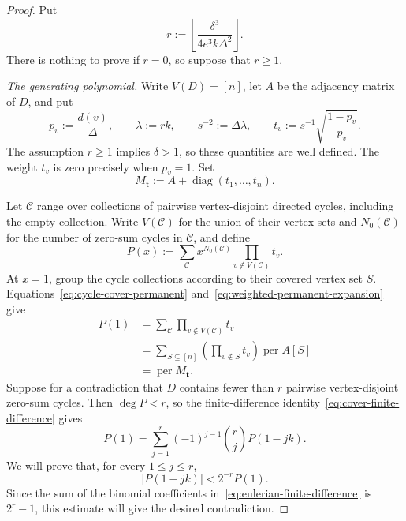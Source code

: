 \documentclass[10pt,a4paper]{amsart}
\newcommand{\diag}{\operatorname{diag}}
\newcommand{\per}{\operatorname{per}}
\begin{document}
\begin{proof}
Put
\[
  r:=\left\lfloor\frac{\delta^3}{4e^3k\Delta^2}\right\rfloor.
\]
There is nothing to prove if $r=0$, so suppose that $r\ge1$.

\medskip\noindent
\emph{The generating polynomial.}
Write $V(D)=[n]$, let $A$ be the adjacency matrix of $D$, and put
\[
  p_v:=\frac{d(v)}\Delta,
  \qquad \lambda:=rk,
  \qquad s^{-2}:=\Delta\lambda,
  \qquad
  t_v:=s^{-1}\sqrt{\frac{1-p_v}{p_v}}.
\]
The assumption $r\ge1$ implies $\delta>1$, so these quantities are
well defined.  The weight $t_v$ is zero precisely when $p_v=1$.
Set
\[
  M_{\mathbf t}:=A+\diag(t_1,\ldots,t_n).
\]

Let $\mathcal C$ range over collections of pairwise vertex-disjoint
directed cycles, including the empty collection.  Write $V(\mathcal C)$
for the union of their vertex sets and $N_0(\mathcal C)$ for the number
of zero-sum cycles in $\mathcal C$, and define
\[
  P(x):=
  \sum_{\mathcal C}x^{N_0(\mathcal C)}
  \prod_{v\notin V(\mathcal C)}t_v.
\]
At $x=1$, group the cycle collections according to their covered
vertex set $S$.  Equations~\eqref{eq:cycle-cover-permanent}
and~\eqref{eq:weighted-permanent-expansion} give
\begin{align*}
  P(1)
  &=\sum_{\mathcal C}\prod_{v\notin V(\mathcal C)}t_v\\
  &=\sum_{S\subseteq[n]}
    \left(\prod_{v\notin S}t_v\right)\per A[S]\\
  &=\per M_{\mathbf t}.
\end{align*}
Suppose for a contradiction that $D$ contains fewer than $r$
pairwise vertex-disjoint zero-sum cycles.  Then $\deg P<r$, so the
finite-difference identity~\eqref{eq:cover-finite-difference} gives
\begin{equation}\label{eq:eulerian-finite-difference}
  P(1)=\sum_{j=1}^r(-1)^{j-1}\binom rj P(1-jk).
\end{equation}
We will prove that, for every $1\le j\le r$,
\begin{equation}\label{eq:eulerian-shifted-target}
  |P(1-jk)|<2^{-r}P(1).
\end{equation}
Since the sum of the binomial coefficients
in~\eqref{eq:eulerian-finite-difference} is $2^r-1$, this estimate will
give the desired contradiction.


\end{proof}
\end{document}
